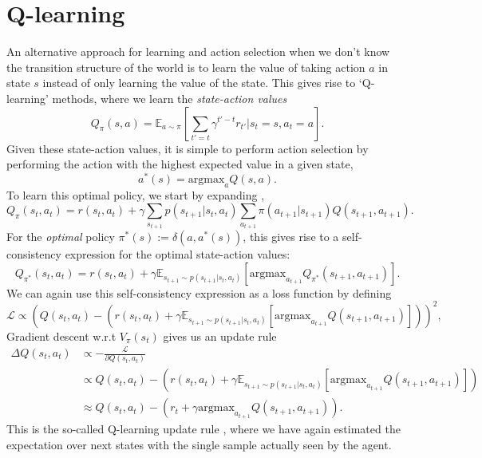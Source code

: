 \section{Q-learning}
\label{sec:q_learning}

An alternative approach for learning and action selection when we don't know the transition structure of the world is to learn the value of taking action $a$ in state $s$ instead of only learning the value of the state.
This gives rise to `Q-learning' methods, where we learn the \emph{state-action values}
\begin{equation}
    \label{eq:Q-values}
    Q_\pi(s,a) =  \mathbb{E}_{a \sim \pi} \left [ \sum_{t'=t} \gamma^{t' - t} r_{t'} | s_{t} = s, a_{t} = a \right ].
\end{equation}
Given these state-action values, it is simple to perform action selection by performing the action with the highest expected value in a given state,
\begin{equation}
    a^*(s) = \text{argmax}_{a} Q(s, a).
\end{equation}
To learn this optimal policy, we start by expanding ,
\begin{equation}
    \label{eq:Q-expanded}
    Q_\pi(s_t,a_t) =  r(s_t, a_t) + \gamma \sum_{s_{t+1}} p(s_{t+1} | s_t, a_t) \sum_{a_{t+1}} \pi(a_{t+1} | s_{t+1}) Q(s_{t+1}, a_{t+1}).
\end{equation}
For the \emph{optimal} policy $\pi^*(s) := \delta(a, a^*(s))$, this gives rise to a self-consistency expression for the optimal state-action values:
\begin{equation}
    \label{eq:Q-optimal}
    Q_{\pi^*}(s_t,a_t) =  r(s_t, a_t) + \gamma \mathbb{E}_{s_{t+1} \sim p(s_{t+1} | s_t, a_t)} \left [ \text{argmax}_{a_{t+1}} Q_{\pi^*}(s_{t+1}, a_{t+1}) \right ].
\end{equation}
We can again use this self-consistency expression as a loss function by defining
\begin{equation}
    \mathcal{L} \propto \left (  Q(s_t,a_t) - (r(s_t, a_t) + \gamma \mathbb{E}_{s_{t+1} \sim p(s_{t+1} | s_t, a_t)} \left [ \text{argmax}_{a_{t+1}} Q(s_{t+1}, a_{t+1}) \right ] ) \right )^2,
\end{equation}
Gradient descent w.r.t $V_\pi(s_t)$ gives us an update rule
\begin{align}
    \Delta  Q(s_t,a_t) & \propto - \frac{\mathcal{L}}{\partial  Q(s_t,a_t)}\\
    &\propto Q(s_t,a_t) - (r(s_t, a_t) + \gamma \mathbb{E}_{s_{t+1} \sim p(s_{t+1} | s_t, a_t)} \left [ \text{argmax}_{a_{t+1}} Q(s_{t+1}, a_{t+1}) \right ] )\\
    &\approx Q(s_t,a_t) - (r_t + \gamma \text{argmax}_{a_{t+1}} Q(s_{t+1}, a_{t+1})).
\end{align}
This is the so-called Q-learning update rule \citep{watkins1989learning}, where we have again estimated the expectation over next states with the single sample actually seen by the agent.

